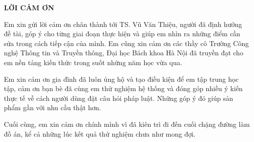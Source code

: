 \documentclass[../DoAn.tex]{subfiles}
\begin{document}
\begin{center}
    \Large{\textbf{LỜI CẢM ƠN}}\\
\end{center}
\vspace{1cm}
Em xin gửi lời cảm ơn chân thành tới TS. Vũ Văn Thiệu, người đã định hướng đề tài, góp ý cho từng giai đoạn thực hiện và giúp em nhìn ra những điểm cần sửa trong cách tiếp cận của mình. Em cũng xin cảm ơn các thầy cô Trường Công nghệ Thông tin và Truyền thông, Đại học Bách khoa Hà Nội đã truyền đạt cho em nền tảng kiến thức trong suốt những năm học vừa qua.

Em xin cảm ơn gia đình đã luôn ủng hộ và tạo điều kiện để em tập trung học tập, cảm ơn bạn bè đã cùng em thử nghiệm hệ thống và đóng góp nhiều ý kiến thực tế về cách người dùng đặt câu hỏi pháp luật. Những góp ý đó giúp sản phẩm gần với nhu cầu thật hơn.

Cuối cùng, em xin cảm ơn chính mình vì đã kiên trì đi đến cuối chặng đường làm đồ án, kể cả những lúc kết quả thử nghiệm chưa như mong đợi.
\end{document}
